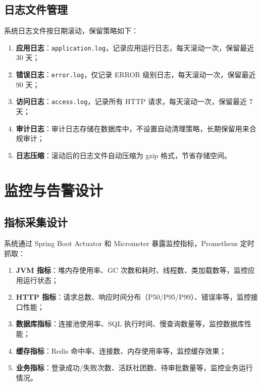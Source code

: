 \subsection{日志文件管理}

系统日志文件按日期滚动，保留策略如下：

\begin{enumerate}
  \item \textbf{应用日志}：\texttt{application.log}，记录应用运行日志，每天滚动一次，保留最近 30 天；

  \item \textbf{错误日志}：\texttt{error.log}，仅记录 ERROR 级别日志，每天滚动一次，保留最近 90 天；

  \item \textbf{访问日志}：\texttt{access.log}，记录所有 HTTP 请求，每天滚动一次，保留最近 7 天；

  \item \textbf{审计日志}：审计日志存储在数据库中，不设置自动清理策略，长期保留用来合规审计；

  \item \textbf{日志压缩}：滚动后的日志文件自动压缩为 gzip 格式，节省存储空间。
\end{enumerate}

\section{监控与告警设计}

\subsection{指标采集设计}

系统通过 Spring Boot Actuator 和 Micrometer 暴露监控指标，Prometheus 定时抓取：

\begin{enumerate}
  \item \textbf{JVM 指标}：堆内存使用率、GC 次数和耗时、线程数、类加载数等，监控应用运行状态；

  \item \textbf{HTTP 指标}：请求总数、响应时间分布（P50/P95/P99）、错误率等，监控接口性能；

  \item \textbf{数据库指标}：连接池使用率、SQL 执行时间、慢查询数量等，监控数据库性能；

  \item \textbf{缓存指标}：Redis 命中率、连接数、内存使用率等，监控缓存效果；

  \item \textbf{业务指标}：登录成功/失败次数、活跃社团数、待审批数量等，监控业务运行情况。
\end{enumerate}


